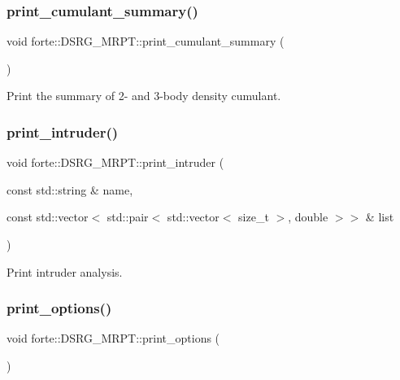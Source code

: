 \subsubsection{\texorpdfstring{print\+\_\+cumulant\+\_\+summary()}{print\_cumulant\_summary()}}
{\footnotesize\ttfamily void forte\+::\+D\+S\+R\+G\+\_\+\+M\+R\+P\+T\+::print\+\_\+cumulant\+\_\+summary (\begin{DoxyParamCaption}{ }\end{DoxyParamCaption})\hspace{0.3cm}{\ttfamily [protected]}}



Print the summary of 2-\/ and 3-\/body density cumulant. 

\mbox{\label{classforte_1_1_d_s_r_g___m_r_p_t_a4f00bb9e58057515a5800379d69495da}} 
\subsubsection{\texorpdfstring{print\+\_\+intruder()}{print\_intruder()}}
{\footnotesize\ttfamily void forte\+::\+D\+S\+R\+G\+\_\+\+M\+R\+P\+T\+::print\+\_\+intruder (\begin{DoxyParamCaption}\item[{const std\+::string \&}]{name,  }\item[{const std\+::vector$<$ std\+::pair$<$ std\+::vector$<$ size\+\_\+t $>$, double $>$$>$ \&}]{list }\end{DoxyParamCaption})\hspace{0.3cm}{\ttfamily [protected]}}



Print intruder analysis. 

\mbox{\label{classforte_1_1_d_s_r_g___m_r_p_t_afd5708ef5c74be6e82cd3701b4f4e968}} 
\subsubsection{\texorpdfstring{print\+\_\+options()}{print\_options()}}
{\footnotesize\ttfamily void forte\+::\+D\+S\+R\+G\+\_\+\+M\+R\+P\+T\+::print\+\_\+options (\begin{DoxyParamCaption}{ }\end{DoxyParamCaption})\hspace{0.3cm}{\ttfamily [protected]}}



